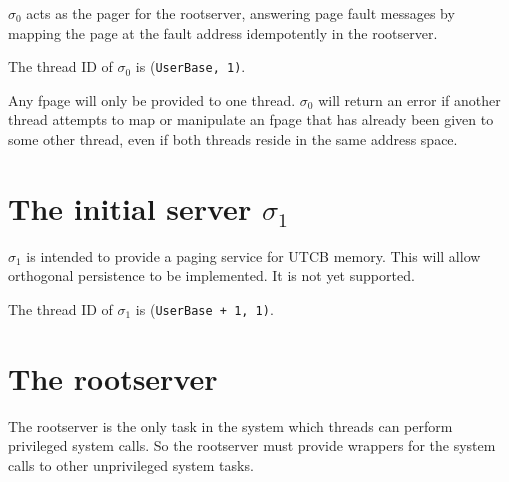 $\sigma_0$ acts as the pager for the rootserver, answering page fault
messages by mapping the page at the fault address idempotently in the
rootserver.

\begin{comment}
  $\sigma_0$ can also be used directly by sending messages to it,
  according to the $\sigma_0$ RPC protocol.  This is used by the kernel
  to allocate reserved memory, but can also be used by the user to
  explicitely allocate more memory than single pages indirectly via
  page faults.
\end{comment}

The thread ID of $\sigma_0$ is (\verb/UserBase, 1)/.

\begin{comment}
  We will write all thread IDs in the form (\verb/thread nr/,
  \verb/version/).
\end{comment}

Any fpage will only be provided to one thread.  $\sigma_0$ will return
an error if another thread attempts to map or manipulate an fpage that
has already been given to some other thread, even if both threads
reside in the same address space.


\section{The initial server $\sigma_1$}

$\sigma_1$ is intended to provide a paging service for UTCB memory.
This will allow orthogonal persistence to be implemented.  It is not
yet supported.

The thread ID of $\sigma_1$ is (\verb/UserBase + 1, 1)/.


\section{The rootserver}
\label{rootserver}

The rootserver is the only task in the system which threads can
perform privileged system calls.  So the rootserver must provide
wrappers for the system calls to other unprivileged system tasks.

\begin{comment}
  For this, a simple authentication scheme is required.  The
  rootserver can keep a small, statically allocated table of threads
  which are granted access to the system call wrappers.  The caller
  could provide the index in the table for fast O(1) lookup instead
  linear search.  Threads with access could be allowed to add other
  threads or change existing table entries.  The same scheme can be
  used in the device driver framework.
  
  The rootserver should have one thread per CPU, and run at a high
  priority.
\end{comment}


